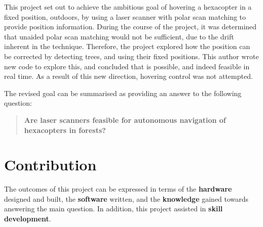 \documentclass[12pt,oneside,a4paper]{book}
\begin{document}


This project set out to achieve the ambitious goal of hovering a
hexacopter in a fixed position, outdoors, by using a laser scanner
with polar scan matching to provide position information. During the
course of the project, it was determined that unaided polar scan
matching would not be sufficient, due to the drift inherent in the
technique. Therefore, the project explored how the position can be
corrected by detecting trees, and using their fixed positions. This
author wrote new code to explore this, and concluded that is possible,
and indeed feasible in real time. As a result of this new direction,
hovering control was not attempted.

The revised goal can be summarised as providing an answer to the
following question:
\begin{quote}
  \textbf{Are laser scanners feasible for autonomous navigation of
    hexacopters in forests?}
\end{quote}

\section{Contribution}
\label{sec:contribution}

The outcomes of this project can be expressed in terms of the
\textbf{hardware} designed and built, the \textbf{software} written,
and the \textbf{knowledge} gained towards answering the main
question. In addition, this project assisted in \textbf{skill
  development}.
\end{document}
